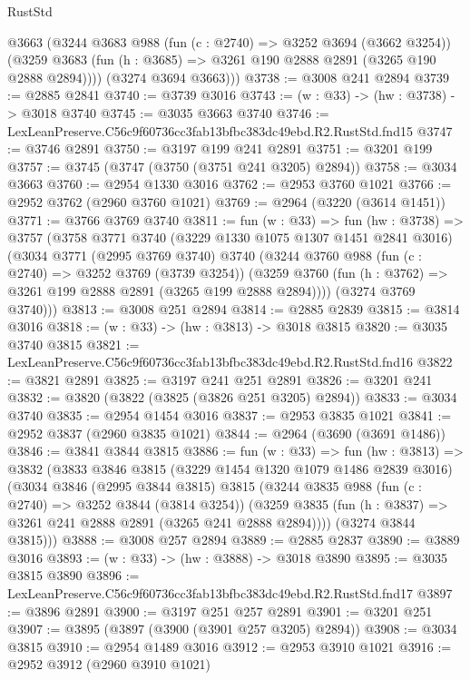 \begin{lexlean}{RustStd}
\begin{coremodule}
        @3663
        (@3244
          @3683
          @988
          (fun (c : @2740) => @3252 @3694 (@3662 @3254))
          (@3259 @3683 (fun (h : @3685) => @3261 @190 @2888 @2891 (@3265 @190 @2888 @2894))))
        (@3274 @3694 @3663)))
@3738 := @3008 @241 @2894
@3739 := @2885 @2841
@3740 := @3739 @3016
@3743 := (w : @33) -> (hw : @3738) -> @3018 @3740
@3745 := @3035 @3663 @3740
@3746 := LexLeanPreserve.C56c9f60736cc3fab13bfbc383dc49ebd.R2.RustStd.fnd15
@3747 := @3746 @2891
@3750 := @3197 @199 @241 @2891
@3751 := @3201 @199
@3757 := @3745 (@3747 (@3750 (@3751 @241 @3205) @2894))
@3758 := @3034 @3663
@3760 := @2954 @1330 @3016
@3762 := @2953 @3760 @1021
@3766 := @2952 @3762 (@2960 @3760 @1021)
@3769 := @2964 (@3220 (@3614 @1451))
@3771 := @3766 @3769 @3740
@3811 := fun (w : @33) =>
  fun (hw : @3738) =>
  @3757
    (@3758
      @3771
      @3740
      (@3229 @1330 @1075 @1307 @1451 @2841 @3016)
      (@3034
        @3771
        (@2995 @3769 @3740)
        @3740
        (@3244
          @3760
          @988
          (fun (c : @2740) => @3252 @3769 (@3739 @3254))
          (@3259 @3760 (fun (h : @3762) => @3261 @199 @2888 @2891 (@3265 @199 @2888 @2894))))
        (@3274 @3769 @3740)))
@3813 := @3008 @251 @2894
@3814 := @2885 @2839
@3815 := @3814 @3016
@3818 := (w : @33) -> (hw : @3813) -> @3018 @3815
@3820 := @3035 @3740 @3815
@3821 := LexLeanPreserve.C56c9f60736cc3fab13bfbc383dc49ebd.R2.RustStd.fnd16
@3822 := @3821 @2891
@3825 := @3197 @241 @251 @2891
@3826 := @3201 @241
@3832 := @3820 (@3822 (@3825 (@3826 @251 @3205) @2894))
@3833 := @3034 @3740
@3835 := @2954 @1454 @3016
@3837 := @2953 @3835 @1021
@3841 := @2952 @3837 (@2960 @3835 @1021)
@3844 := @2964 (@3690 (@3691 @1486))
@3846 := @3841 @3844 @3815
@3886 := fun (w : @33) =>
  fun (hw : @3813) =>
  @3832
    (@3833
      @3846
      @3815
      (@3229 @1454 @1320 @1079 @1486 @2839 @3016)
      (@3034
        @3846
        (@2995 @3844 @3815)
        @3815
        (@3244
          @3835
          @988
          (fun (c : @2740) => @3252 @3844 (@3814 @3254))
          (@3259 @3835 (fun (h : @3837) => @3261 @241 @2888 @2891 (@3265 @241 @2888 @2894))))
        (@3274 @3844 @3815)))
@3888 := @3008 @257 @2894
@3889 := @2885 @2837
@3890 := @3889 @3016
@3893 := (w : @33) -> (hw : @3888) -> @3018 @3890
@3895 := @3035 @3815 @3890
@3896 := LexLeanPreserve.C56c9f60736cc3fab13bfbc383dc49ebd.R2.RustStd.fnd17
@3897 := @3896 @2891
@3900 := @3197 @251 @257 @2891
@3901 := @3201 @251
@3907 := @3895 (@3897 (@3900 (@3901 @257 @3205) @2894))
@3908 := @3034 @3815
@3910 := @2954 @1489 @3016
@3912 := @2953 @3910 @1021
@3916 := @2952 @3912 (@2960 @3910 @1021)

\end{coremodule}
\end{lexlean}
